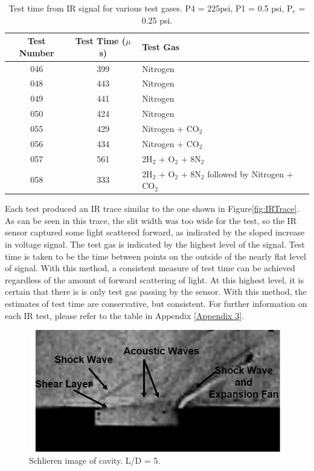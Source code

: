 \begin{table}[]
\centering
\caption[Test time calculated with IR signal]{Test time from IR signal for various test gases. P4 = 225psi, P1 = 0.5 psi, P$_e$ = 0.25 psi.}
\label{Table:IRtest}
\begin{tabular}{c|c|l}

Test Number & Test Time ($\mu$s) & Test Gas\\ \hline
046         & 399        &Nitrogen     \\ 
048         & 443        &Nitrogen     \\ 
049         & 441        &Nitrogen     \\ 
050         & 424        &Nitrogen     \\ 
055			& 429		 &Nitrogen + CO$_2$	\\
056			& 434		 &Nitrogen + CO$_2$  \\
057			& 561 		 &2H$_2$ + O$_2$ + 8N$_2$			   \\
058			& 333		 &2H$_2$ + O$_2$ + 8N$_2$ followed by Nitrogen + CO$_2$			   \\
\end{tabular}
\end{table}

Each test produced an IR trace similar to the one shown in Figure\ref{fig:IRTrace}. As can be seen in this trace, the slit width was too wide for the test, so the IR sensor captured some light scattered forward, as indicated by the sloped increase in voltage signal. The test gas is indicated by the highest level of the signal. Test time is taken to be the time between points on the outside of the nearly flat level of signal. With this method, a consistent measure of test time can be achieved regardless of the amount of forward scattering of light. At this highest level, it is certain that there is is only test gas passing by the sensor. With this method, the estimates of test time are conservative, but consistent. For further information on each IR test, please refer to the table in Appendix \ref{Appendix 3}.


\newpage

\begin{figure}
\centering
\includegraphics[width = \textwidth]{Figures/5.jpg}
\caption[Schlieren image of cavity. L/D = 5.]{Schlieren image of cavity. L/D = 5.}
\label{fig:5}
\end{figure}

